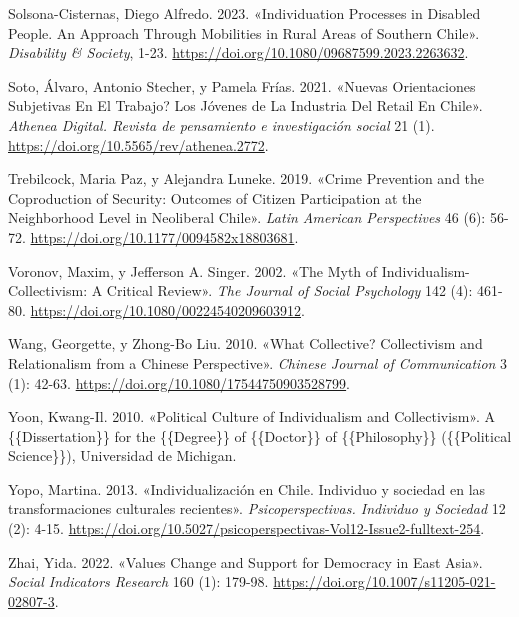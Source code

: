 \documentclass[
  letterpaper,
  DIV=11,
  numbers=noendperiod]{scrartcl}
\newlength{\cslhangindent}
\newenvironment{CSLReferences}[2] %
 {\begin{list}{}{%
  \setlength{\itemindent}{0pt}
  \setlength{\leftmargin}{0pt}
  \setlength{\parsep}{0pt}
  \ifodd #1
   \setlength{\leftmargin}{\cslhangindent}
   \setlength{\itemindent}{-1\cslhangindent}
  \fi
  \setlength{\itemsep}{#2\baselineskip}}}
 {\end{list}}
\begin{document}
\begin{CSLReferences}{1}{0}
Solsona-Cisternas, Diego Alfredo. 2023. {«Individuation Processes in
Disabled People. {An} Approach Through Mobilities in Rural Areas of
Southern {Chile}»}. \emph{Disability \& Society}, 1-23.
\url{https://doi.org/10.1080/09687599.2023.2263632}.

Soto, Álvaro, Antonio Stecher, y Pamela Frías. 2021.
{«{\textquestiondown}{Nuevas} Orientaciones Subjetivas En El Trabajo?
{Los} J{ó}venes de La Industria Del Retail En {Chile}»}. \emph{Athenea
Digital. Revista de pensamiento e investigaci{ó}n social} 21 (1).
\url{https://doi.org/10.5565/rev/athenea.2772}.

Trebilcock, Maria Paz, y Alejandra Luneke. 2019. {«Crime {Prevention}
and the {Coproduction} of {Security}: {Outcomes} of {Citizen
Participation} at the {Neighborhood Level} in {Neoliberal Chile}»}.
\emph{Latin American Perspectives} 46 (6): 56-72.
\url{https://doi.org/10.1177/0094582x18803681}.

Voronov, Maxim, y Jefferson A. Singer. 2002. {«The {Myth} of
{Individualism-Collectivism}: {A Critical Review}»}. \emph{The Journal
of Social Psychology} 142 (4): 461-80.
\url{https://doi.org/10.1080/00224540209603912}.

Wang, Georgette, y Zhong-Bo Liu. 2010. {«What Collective? {Collectivism}
and Relationalism from a {Chinese} Perspective»}. \emph{Chinese Journal
of Communication} 3 (1): 42-63.
\url{https://doi.org/10.1080/17544750903528799}.

Yoon, Kwang-Il. 2010. {«Political {Culture} of {Individualism} and
{Collectivism}»}. A \{\{Dissertation\}\} for the \{\{Degree\}\} of
\{\{Doctor\}\} of \{\{Philosophy\}\} (\{\{Political Science\}\}),
Universidad de Michigan.

Yopo, Martina. 2013. {«{Individualizaci{ó}n en Chile. Individuo y
sociedad en las transformaciones culturales recientes}»}.
\emph{Psicoperspectivas. Individuo y Sociedad} 12 (2): 4-15.
\url{https://doi.org/10.5027/psicoperspectivas-Vol12-Issue2-fulltext-254}.

Zhai, Yida. 2022. {«Values {Change} and {Support} for {Democracy} in
{East Asia}»}. \emph{Social Indicators Research} 160 (1): 179-98.
\url{https://doi.org/10.1007/s11205-021-02807-3}.

\end{CSLReferences}
\end{document}
